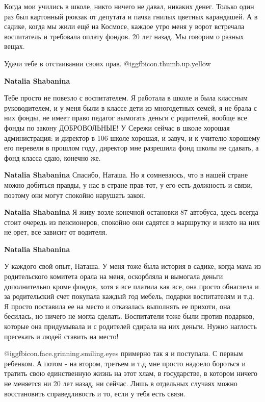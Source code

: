 \begin{itemize}
\begin{itemize}

Когда мои учились в школе, никто ничего не давал, никаких денег. Только один
раз был картонный рюкзак от депутата и пачка гнилых цветных карандашей. А в
садике, когда мы жили ещё на Космосе, каждое утро меня у ворот встречала
воспитатель и требовала оплату фондов. 20 лет назад. Мы говорим о разных вещах.

Удачи тебе в отстаивании своих прав.  @igg{fbicon.thumb.up.yellow} 

\textbf{Natalia Shabanina} 

Тебе просто не повезло с воспитателем. Я работала в школе и была классным
руководителем, и у меня были в классе дети из многодетных семей, я не брала с
них фонды, не имеет право педагог вымогать деньги с родителей, вообще все фонды
по закону ДОБРОВОЛЬНЫЕ! У Сережи сейчас в школе хорошая администрация: и
директор в 106 школе хорошая, и завуч, и к учителю хорошему его перевели в
прошлом году, директор мне разрешила фонд школы не сдавать, а фонд класса сдаю,
конечно же.

\textbf{Natalia Shabanina} Спасибо, Наташа. Но я сомневаюсь, что в нашей стране можно добиться правды, у нас в стране прав тот, у его есть должность и связи, поэтому они могут спокойно нарушать закон.

\textbf{Natalia Shabanina} Я живу возле конечной остановки 87 автобуса, здесь всегда стоит очередь из пенсионеров, спокойно они садятся в маршрутку и никто на них не орет, все зависит от водителя.

\textbf{Natalia Shabanina} 

У каждого свой опыт, Наташа. У меня тоже была история в садике, когда мама из
родительского комитета орала на меня, оскорбляла и вымогала деньги
дополнительно кроме фондов, хотя я все платила как все, она просто обнаглела и
за родительский счет покупала каждый год мебель, подарки воспитателям и т.д. Я
просто поставила ее на место и отказалась выполнять ее прихоти, она бесилась,
но ничего не могла сделать. Воспитатели тоже были против подарков, которые она
придумывала и с родителей сдирала на них деньги. Нужно наглость пресекать и
людей ставить на место!


 @igg{fbicon.face.grinning.smiling.eyes}  примерно так я и поступала. С первым ребенком. А потом - на втором, третьем
и т.д мне просто надоело бороться и тратить свою единственную жизнь на этот
хлам, в государстве, в котором ничего не меняется ни 20 лет назад, ни сейчас.
Лишь в отдельных случаях можно восстановить справедливость и то, если у тебя
есть связи.


\end{itemize}
\end{itemize}
